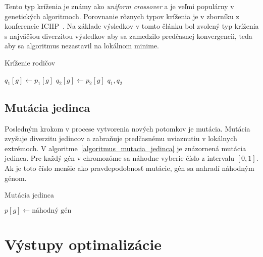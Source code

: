Tento typ kríženia je známy ako \textit{uniform crossover} a je veľmi populárny v genetických algoritmoch.
Porovnanie rôznych typov kríženia je v zborníku z konferencie ICIIP~\cite{bala2015comparative}.
Na základe výsledkov v tomto článku bol zvolený typ kríženia s najväčšou diverzitou výsledkov aby sa zamedzilo predčasnej konvergencii, teda aby sa algoritmus nezastavil na lokálnom minime.

\vspace*{\dimexpr0.5\baselineskip\relax}
\begin{algorithm}[h]\label{algoritmus_krizenie_rodicov}
\caption{Kríženie rodičov}
   {
     {
      $q_1[g] \gets p_1[g]$\;
      $q_2[g] \gets p_2[g]$\;
    }
  }
  \Return $q_1, q_2$\;
\end{algorithm}

\subsection*{Mutácia jedinca}
Posledným krokom v procese vytvorenia nových potomkov je mutácia.
Mutácia zvyšuje diverzitu jedincov a zabraňuje predčasnému uviaznutiu v lokálnych extrémoch.
V algoritme~\ref{algoritmus_mutacia_jedinca} je znázornená mutácia jedinca.
Pre každý gén v chromozóme sa náhodne vyberie číslo z intervalu $[0,1]$.
Ak je toto číslo menšie ako pravdepodobnosť mutácie, gén sa nahradí náhodným génom.

\vspace*{\dimexpr0.5\baselineskip\relax}
\begin{algorithm}[h]\label{algoritmus_mutacia_jedinca}
\caption{Mutácia jedinca}
   {
     {
      $p[g] \gets \text{náhodný gén}$\;
    }
  }
\end{algorithm}

\section{Výstupy optimalizácie}\label{vystupy_optimalizacie}

